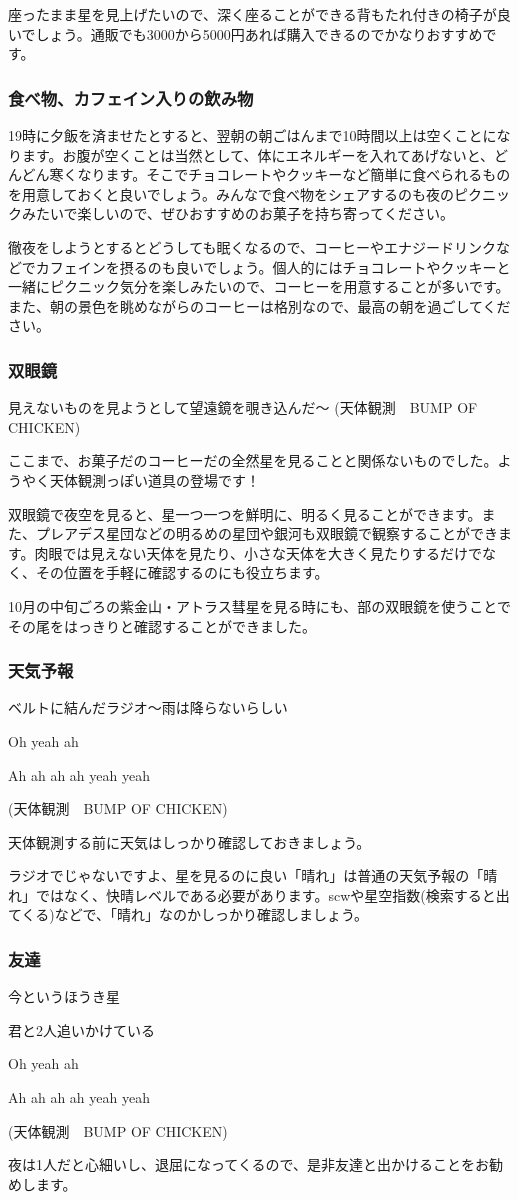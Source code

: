 \documentclass[../main]{subfiles}
\begin{document}
座ったまま星を見上げたいので、深く座ることができる背もたれ付きの椅子が良いでしょう。通販でも3000から5000円あれば購入できるのでかなりおすすめです。

\subsubsection{食べ物、カフェイン入りの飲み物}
19時に夕飯を済ませたとすると、翌朝の朝ごはんまで10時間以上は空くことになります。お腹が空くことは当然として、体にエネルギーを入れてあげないと、どんどん寒くなります。そこでチョコレートやクッキーなど簡単に食べられるものを用意しておくと良いでしょう。みんなで食べ物をシェアするのも夜のピクニックみたいで楽しいので、ぜひおすすめのお菓子を持ち寄ってください。

徹夜をしようとするとどうしても眠くなるので、コーヒーやエナジードリンクなどでカフェインを摂るのも良いでしょう。個人的にはチョコレートやクッキーと一緒にピクニック気分を楽しみたいので、コーヒーを用意することが多いです。また、朝の景色を眺めながらのコーヒーは格別なので、最高の朝を過ごしてください。

\subsubsection{双眼鏡}

見えないものを見ようとして望遠鏡を覗き込んだ〜 (天体観測　BUMP OF CHICKEN)

ここまで、お菓子だのコーヒーだの全然星を見ることと関係ないものでした。ようやく天体観測っぽい道具の登場です！

双眼鏡で夜空を見ると、星一つ一つを鮮明に、明るく見ることができます。また、プレアデス星団などの明るめの星団や銀河も双眼鏡で観察することができます。肉眼では見えない天体を見たり、小さな天体を大きく見たりするだけでなく、その位置を手軽に確認するのにも役立ちます。

10月の中旬ごろの紫金山・アトラス彗星を見る時にも、部の双眼鏡を使うことでその尾をはっきりと確認することができました。

\subsubsection{天気予報}
ベルトに結んだラジオ〜雨は降らないらしい

Oh yeah ah

Ah ah ah ah yeah yeah


(天体観測　BUMP OF CHICKEN)

天体観測する前に天気はしっかり確認しておきましょう。

ラジオでじゃないですよ、星を見るのに良い「晴れ」は普通の天気予報の「晴れ」ではなく、快晴レベルである必要があります。scwや星空指数(検索すると出てくる)などで、「晴れ」なのかしっかり確認しましょう。


\subsubsection{友達}

今というほうき星

君と2人追いかけている

Oh yeah ah

Ah ah ah ah yeah yeah


(天体観測　BUMP OF CHICKEN)

夜は1人だと心細いし、退屈になってくるので、是非友達と出かけることをお勧めします。
\end{document}
